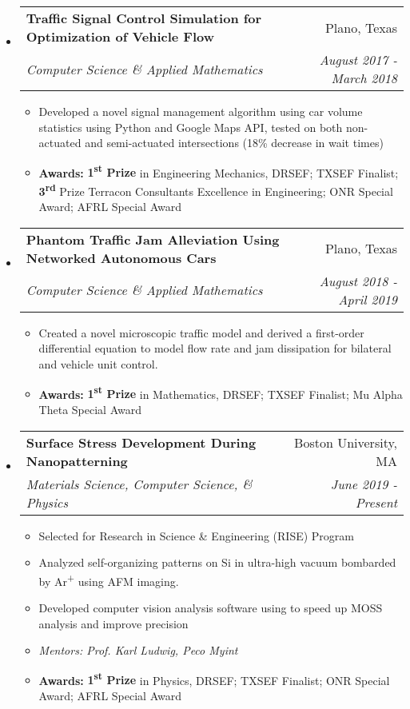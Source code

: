 \documentclass[letterpaper,11pt]{article}
\makeatletter
\newcommand{\resitem}[1]{\item #1 \vspace{-3pt}}
\newcommand{\ressubheading}[4]{
	\begin{tabular*}{7.0in}{l@{\extracolsep{\fill}}r}
			#1 & #2 \\
			\textit{#3} & \textit{#4}
	\end{tabular*}\vspace{-6pt}
}
\makeatother
\begin{document}
\begin{itemize}[leftmargin=*]

	\item
		\ressubheading{\textbf{Traffic Signal Control Simulation for Optimization of Vehicle Flow}}{Plano, Texas}{Computer Science \& Applied Mathematics}{August 2017 - March 2018}
			\begin{itemize}[leftmargin=*]
				\resitem{Developed a novel signal management algorithm using car volume statistics using Python and Google Maps API, tested on both non-actuated and semi-actuated intersections (18\% decrease in wait times)}
				\resitem{\textbf{Awards:} \textbf{1\textsuperscript{st} Prize} in Engineering Mechanics, DRSEF; TXSEF Finalist; \textbf{3\textsuperscript{rd}} Prize Terracon Consultants Excellence in Engineering; ONR Special Award; AFRL Special Award}
			\end{itemize}
	\item
		\ressubheading{\textbf{Phantom Traffic Jam Alleviation Using Networked Autonomous Cars}}{Plano, Texas}{Computer Science \& Applied Mathematics}{August 2018 - April 2019}
			\begin{itemize}
				\resitem{Created a novel microscopic traffic model and derived a first-order differential equation to model flow rate and jam dissipation for bilateral and vehicle unit control.}
				\resitem{\textbf{Awards:} \textbf{1\textsuperscript{st} Prize} in Mathematics, DRSEF; TXSEF Finalist; Mu Alpha Theta Special Award}
			\end{itemize}

	\item
		\ressubheading{\textbf{Surface Stress Development During Nanopatterning}}{Boston University, MA}{Materials Science, Computer Science, \& Physics}{June 2019 - Present}
			\begin{itemize}
				\resitem{Selected for Research in Science \& Engineering (RISE) Program}
				\resitem{Analyzed self-organizing patterns on Si in ultra-high vacuum bombarded by Ar\textsuperscript{+} using AFM imaging.}
				\resitem{Developed computer vision analysis software using to speed up MOSS analysis and improve precision}
				\resitem{\textit{Mentors: Prof. Karl Ludwig, Peco Myint}}
				\resitem{\textbf{Awards:} \textbf{1\textsuperscript{st} Prize} in Physics, DRSEF; TXSEF Finalist; ONR Special Award; AFRL Special Award}
			\end{itemize}\vspace{-6pt}
	\end{itemize}
\end{document}
